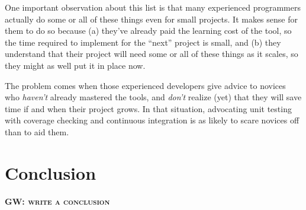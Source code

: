 \documentclass[10pt]{article}
\newcommand{\fixme}[2]{\textsc{\textbf{{#1}: {#2}}}}
\begin{document}
One important observation about this list is that many experienced
programmers actually do some or all of these things even for small
projects. It makes sense for them to do so because (a) they've already
paid the learning cost of the tool, so the time required to implement
for the ``next'' project is small, and (b) they understand that their
project will need some or all of these things as it scales, so they
might as well put it in place now.

The problem comes when those experienced developers give advice to
novices who \emph{haven't} already mastered the tools, and
\emph{don't} realize (yet) that they will save time if and when their
project grows.  In that situation, advocating unit testing with
coverage checking and continuous integration is as likely to scare
novices off than to aid them.

\section{Conclusion}\label{sec:conclusion}

\fixme{GW}{write a conclusion}


\end{document}
